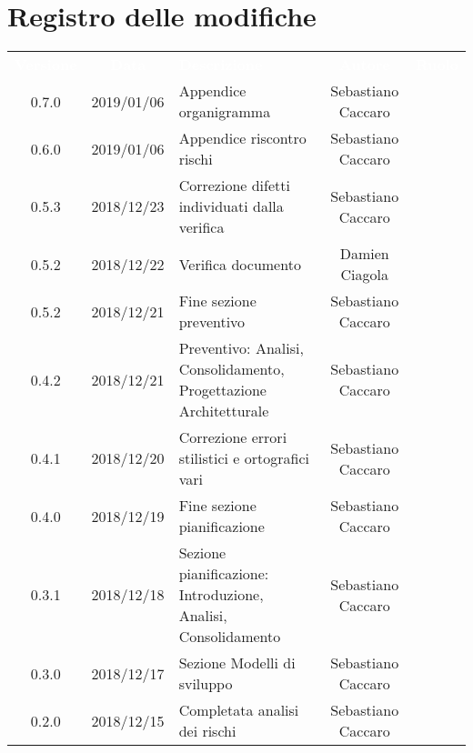 
\section*{Registro delle modifiche}
{
	\renewcommand{\arraystretch}{1.5}
	\centering
	\begin{longtable}{ c c  C{4cm}  c  c }
		
		\textcolor{white}{\textbf{Versione}} & \textcolor{white}{\textbf{Data}} & \textcolor{white}{\textbf{Descrizione}} & \textcolor{white}{\textbf{Autore}} & \textcolor{white}{\textbf{Ruolo}}\\
		0.7.0 & 2019/01/06 & Appendice organigramma & Sebastiano Caccaro & \Res{}\\		
		
		0.6.0 & 2019/01/06 & Appendice riscontro rischi & Sebastiano Caccaro & \Res{}\\
					
		0.5.3 & 2018/12/23 & Correzione difetti individuati dalla verifica & Sebastiano Caccaro & \Res{}\\		
		
		0.5.2 & 2018/12/22 & Verifica documento & Damien Ciagola & \ver{}\\
		
		0.5.2 & 2018/12/21 & Fine sezione preventivo & Sebastiano Caccaro & \Res{}\\
		
		0.4.2 & 2018/12/21 & Preventivo: Analisi, Consolidamento, Progettazione Architetturale & Sebastiano Caccaro & \Res{}\\
		
		0.4.1 & 2018/12/20 & Correzione errori stilistici e ortografici vari & Sebastiano Caccaro & \Res{}\\
		
		0.4.0 & 2018/12/19 & Fine sezione pianificazione & Sebastiano Caccaro & \Res{}\\
		
		0.3.1 & 2018/12/18 & Sezione pianificazione: Introduzione, Analisi, Consolidamento & Sebastiano Caccaro & \Res{}\\
		
		0.3.0 & 2018/12/17 & Sezione Modelli di sviluppo & Sebastiano Caccaro & \Res{}\\
				
		0.2.0 & 2018/12/15 & Completata analisi dei rischi & Sebastiano Caccaro & \Res{}\\
				

\end{longtable}}
